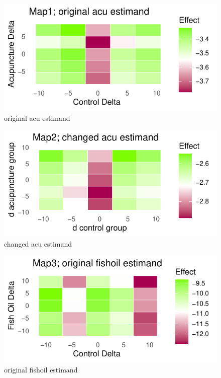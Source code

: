 \documentclass{article}
\newcommand{\pandocbounded}[1]{#1}
\begin{document}
\newpage

\begin{figure}
\centering
\pandocbounded{\includegraphics[keepaspectratio]{Final_Report_files/figure-latex/unnamed-chunk-44-1.pdf}}
\caption{original acu estimand}
\end{figure}

\begin{figure}
\centering
\pandocbounded{\includegraphics[keepaspectratio]{Final_Report_files/figure-latex/unnamed-chunk-45-1.pdf}}
\caption{changed acu estimand}
\end{figure}

\begin{figure}
\centering
\pandocbounded{\includegraphics[keepaspectratio]{Final_Report_files/figure-latex/unnamed-chunk-46-1.pdf}}
\caption{original fishoil estimand}
\end{figure}
\end{document}
